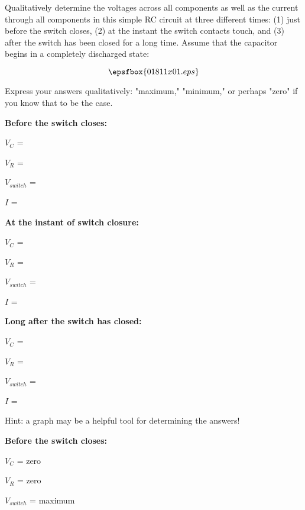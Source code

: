 

Qualitatively determine the voltages across all components as well as the current through all components in this simple RC circuit at three different times: (1) just before the switch closes, (2) at the instant the switch contacts touch, and (3) after the switch has been closed for a long time.  Assume that the capacitor begins in a completely discharged state:

$$\epsfbox{01811x01.eps}$$

Express your answers qualitatively: "maximum," "minimum," or perhaps "zero" if you know that to be the case.

\vskip 10pt
\goodbreak

\noindent
{\bf Before the switch closes:}

$V_{C}$ = 

$V_{R}$ = 

$V_{switch}$ = 

$I$ = 

\vskip 10pt
\goodbreak

\noindent
{\bf At the instant of switch closure:}

$V_{C}$ = 

$V_{R}$ = 

$V_{switch}$ = 

$I$ = 

\vskip 10pt
\goodbreak

\noindent
{\bf Long after the switch has closed:}

$V_{C}$ = 

$V_{R}$ = 

$V_{switch}$ = 

$I$ = 

\vskip 10pt

Hint: a graph may be a helpful tool for determining the answers!







\noindent
{\bf Before the switch closes:}

$V_{C}$ = zero

$V_{R}$ = zero

$V_{switch}$ = maximum

